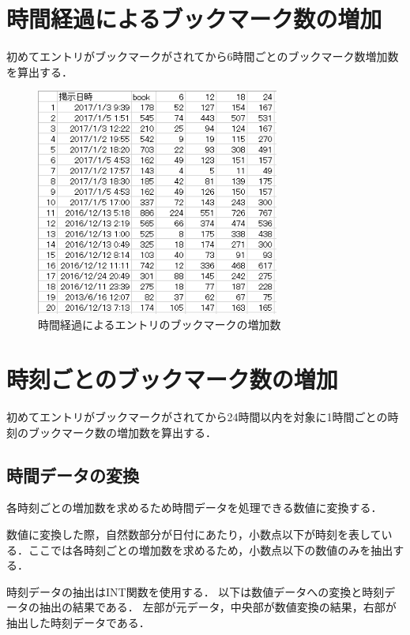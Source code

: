 \newpage

\section{時間経過によるブックマーク数の増加}
初めてエントリがブックマークがされてから6時間ごとのブックマーク数増加数を算出する．

\begin{figure}[htb]
\centering
\includegraphics[width=8cm]{excel5.PNG}
\caption{時間経過によるエントリのブックマークの増加数}\label{excel5}
\end{figure}

\newpage

\section{時刻ごとのブックマーク数の増加}
初めてエントリがブックマークがされてから24時間以内を対象に1時間ごとの時刻のブックマーク数の増加数を算出する．


\subsection{時間データの変換}
各時刻ごとの増加数を求めるため時間データを処理できる数値に変換する．\par
数値に変換した際，自然数部分が日付にあたり，小数点以下が時刻を表している．ここでは各時刻ごとの増加数を求めるため，小数点以下の数値のみを抽出する．\par
時刻データの抽出はINT関数を使用する．
以下は数値データへの変換と時刻データの抽出の結果である．
左部が元データ，中央部が数値変換の結果，右部が抽出した時刻データである．

